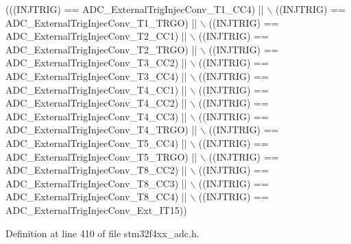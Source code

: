 \begin{DoxyCode}
(((INJTRIG) == ADC\_ExternalTrigInjecConv\_T1\_CC4) || \(\backslash\)
                                        ((INJTRIG) == ADC\_ExternalTrigInjecConv\_T1\_TRGO) || \(\backslash\)
                                        ((INJTRIG) == ADC\_ExternalTrigInjecConv\_T2\_CC1) || \(\backslash\)
                                        ((INJTRIG) == ADC\_ExternalTrigInjecConv\_T2\_TRGO) || \(\backslash\)
                                        ((INJTRIG) == ADC\_ExternalTrigInjecConv\_T3\_CC2) || \(\backslash\)
                                        ((INJTRIG) == ADC\_ExternalTrigInjecConv\_T3\_CC4) || \(\backslash\)
                                        ((INJTRIG) == ADC\_ExternalTrigInjecConv\_T4\_CC1) || \(\backslash\)
                                        ((INJTRIG) == ADC\_ExternalTrigInjecConv\_T4\_CC2) || \(\backslash\)
                                        ((INJTRIG) == ADC\_ExternalTrigInjecConv\_T4\_CC3) || \(\backslash\)
                                        ((INJTRIG) == ADC\_ExternalTrigInjecConv\_T4\_TRGO) || \(\backslash\)
                                        ((INJTRIG) == ADC\_ExternalTrigInjecConv\_T5\_CC4) || \(\backslash\)
                                        ((INJTRIG) == ADC\_ExternalTrigInjecConv\_T5\_TRGO) || \(\backslash\)
                                        ((INJTRIG) == ADC\_ExternalTrigInjecConv\_T8\_CC2) || \(\backslash\)
                                        ((INJTRIG) == ADC\_ExternalTrigInjecConv\_T8\_CC3) || \(\backslash\)
                                        ((INJTRIG) == ADC\_ExternalTrigInjecConv\_T8\_CC4) || \(\backslash\)
                                        ((INJTRIG) == ADC\_ExternalTrigInjecConv\_Ext\_IT15))
\end{DoxyCode}


Definition at line 410 of file stm32f4xx\-\_\-adc.\-h.

